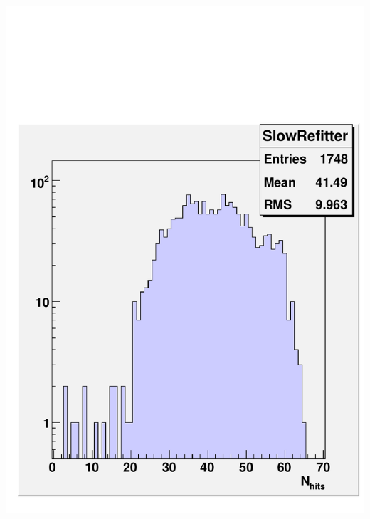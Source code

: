 \documentclass[compress]{beamer}
\begin{document}
\begin{frame}
\begin{columns}
\includegraphics[width=\linewidth]{nhits_slow.pdf}
\end{columns}
\end{frame}
\end{document}
